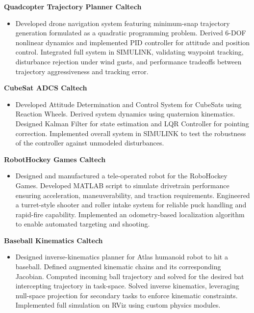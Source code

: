 \documentclass[11pt,a4paper]{article}
\begin{document}
\noindent\textbf{Quadcopter Trajectory Planner \textbar{} Caltech}
\begin{itemize}[leftmargin=1.2em, itemsep=0.2pt, topsep=0.4pt, after=\vspace{4pt}]
    \item Developed drone navigation system featuring minimum-snap trajectory generation formulated as a quadratic programming problem. Derived 6-DOF nonlinear dynamics and implemented PID controller for attitude and position control. Integrated full system in SIMULINK, validating waypoint tracking, disturbance rejection under wind gusts, and performance tradeoffs between trajectory aggressiveness and tracking error.
\end{itemize}

\noindent\textbf{CubeSat ADCS \textbar{} Caltech}
\begin{itemize}[leftmargin=1.2em, itemsep=0.2pt, topsep=0.4pt, after=\vspace{4pt}]
    \item Developed Attitude Determination
    and Control System for CubeSats using Reaction Wheels. Derived system dynamics using quaternion kinematics. Designed Kalman Filter for state estimation and LQR Controller for pointing correction. Implemented overall system in SIMULINK to test the robustness of the controller against unmodeled disturbances.
\end{itemize}

\noindent\textbf{RobotHockey Games \textbar{} Caltech}
\begin{itemize}[leftmargin=1.2em, itemsep=0.2pt, topsep=0.4pt, after=\vspace{4pt}]
    \item Designed and manufactured a tele-operated robot for the RoboHockey Games. Developed MATLAB script to simulate drivetrain performance ensuring acceleration, maneuverability, and traction requirements. Engineered a turret-style shooter and roller intake system for reliable puck handling and rapid-fire capability. Implemented an odometry-based localization algorithm to enable automated targeting and shooting.
\end{itemize}

\noindent\textbf{Baseball Kinematics \textbar{} Caltech}
\begin{itemize}[leftmargin=1.2em, itemsep=0.2pt, topsep=0.4pt, after=\vspace{4pt}]
    \item Designed inverse-kinematics planner for Atlas humanoid robot to hit a baseball. Defined augmented kinematic chains and its corresponding Jacobian. Computed incoming ball trajectory and solved for the desired bat intercepting trajectory in task-space. Solved inverse kinematics, leveraging null-space projection for secondary tasks to enforce kinematic constraints. Implemented full simulation on RViz using custom physics modules.
\end{itemize}
\end{document}
